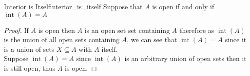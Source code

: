 \begin{proposition}{Interior is Itself}{interior_is_itself}
Suppose that \( A \) is open if and only if  \( \operatorname{ int } \left( A \right) = A  \) 
\end{proposition}
\begin{proof}
If \( A \) is open then \( A \) is an open set set containing \( A \) therefore
as \( \operatorname{int} \left( A \right)  \) is the union of all open sets
containing \( A \), we can see that \( \operatorname{int} \left( A \right) = A
\) since it is a union of sets \( X \subseteq A \) with \( A \) itself. \\
Suppose \( \operatorname{int} \left( A \right) = A \) since \(
\operatorname{int} \left( A \right)  \) is an arbitrary union of open sets then
it is still open, thus \( A \) is open.
\end{proof}
